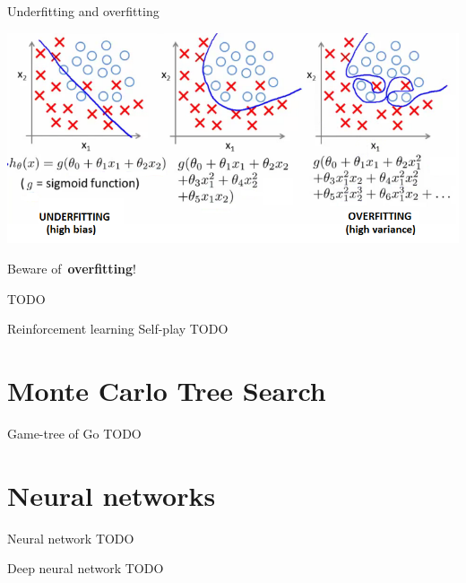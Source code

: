 \documentclass{beamer}
\newcommand{\todo}{\alert{TODO}}
\begin{document}
  {
    \begin{frame}{Underfitting and overfitting}
      \begin{center}
        \includegraphics[width=\textwidth]{../img/underfitting_and_overfitting.png}
        \pause

        Beware of~\textbf{overfitting}!
      \end{center}

      \todo
    \end{frame}
  }

  \begin{frame}{Reinforcement learning}
    \alert{Self-play}
    \todo
  \end{frame}


  \section{Monte Carlo Tree Search}
  \begin{frame}{Game-tree of Go}
    \todo
  \end{frame}


  \section{Neural networks}
  \begin{frame}{Neural network}
    \todo
  \end{frame}

  \begin{frame}{Deep neural network}
    \todo
  \end{frame}
\end{document}
